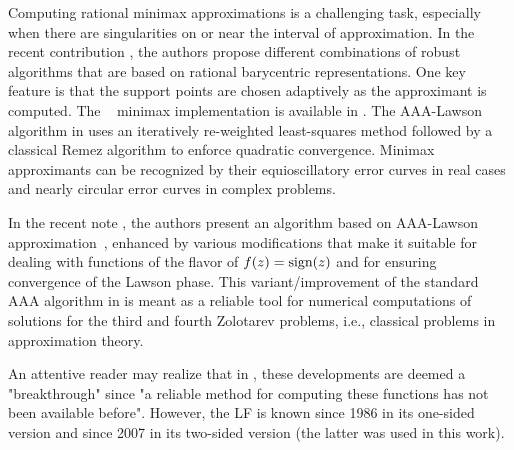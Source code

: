 Computing rational minimax approximations is a challenging task, especially when there are singularities on or near the interval of approximation. In the recent contribution \cite{fntb18}, the authors propose different combinations of robust algorithms that are based on rational barycentric representations. One key feature is that the support points are chosen adaptively as the approximant is computed. The \chebfun~ minimax implementation is available in  \cite{chebfun}. The  AAA-Lawson algorithm in \cite{nakatsukasa2020algorithm} uses an iteratively re-weighted least-squares method followed by a classical Remez algorithm to enforce  quadratic convergence. Minimax approximants can be recognized by their equioscillatory error curves in real cases and nearly circular error curves in complex problems.


In the recent note \cite{trefethen2024computation}, the authors present an algorithm based on AAA-Lawson approximation~\cite{nakatsukasa2020algorithm}, enhanced by various modifications that make it suitable for dealing with functions of the flavor of $f(z) = \hbox{sign}(z)$ and for ensuring convergence of the Lawson phase. This variant/improvement of the standard AAA algorithm in \cite{nst18} is meant as a reliable tool for numerical computations of solutions for the third and fourth Zolotarev problems, i.e., classical problems in approximation theory.


An attentive reader may realize that in \cite{trefethen2024computation}, these developments are deemed a "breakthrough" since "a reliable method for computing these functions has not been available before". However, the LF is known since 1986 in its one-sided version \cite{aa86} and since 2007 in its two-sided version \cite{ajm07} (the latter was used in this work).


